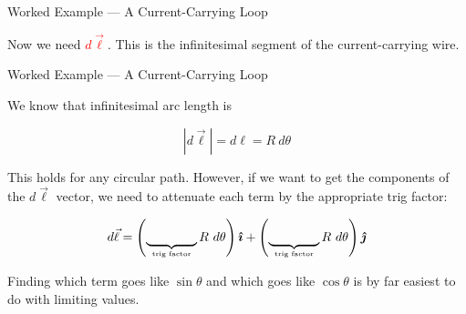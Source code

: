 \documentclass{beamer}
\begin{document}
\begin{frame}{Worked Example --- A Current-Carrying Loop}

Now we need \textcolor{RED}{$d\vec{\ell}$}. This is the infinitesimal segment of the current-carrying wire.

\begin{figure}
\centering
{}
\end{figure}

\end{frame}

\begin{frame}{Worked Example --- A Current-Carrying Loop}

 We know that infinitesimal arc length is

\begin{equation*}
    \left| d\vec{\ell} \right| = d\ell = R\ d\theta
\end{equation*}

This holds for any circular path. However, if we want to get the components of the $d\vec{\ell}$ vector, we need to attenuate each term by the appropriate trig factor:

\begin{equation*}
    d\vec{\ell} = \left( \underbrace{\hspace{4em}}_{\parbox[c]{4em}{\centering \text{\tiny trig factor}}} R\ d\theta \right) \ihat + \left( \underbrace{\hspace{4em}}_{\parbox[c]{4em}{\centering \text{\tiny trig factor}}} R\ d\theta \right) \jhat
\end{equation*}

Finding which term goes like $\sin{\theta}$ and which goes like $\cos{\theta}$ is by far easiest to do with limiting values.

\end{frame}
\end{document}
